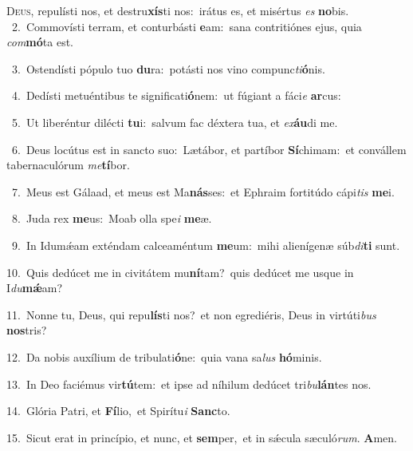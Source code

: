 \lettrine{\initial\textcolor{\initialcolor}{D}}{eus,} repulísti nos, et destru\-\textbf{xís}\-ti nos:~\star irátus es, et misértus \textit{es} \textbf{no}\-bis.\\
{\numbfont\textcolor{\numbcolor}{~2.}}~Commovísti terram, et conturbásti \textbf{e}\-am:~\star sana contritiónes ejus, quia \textit{com}\-\textbf{mó}ta est.\par
{\numbfont\textcolor{\numbcolor}{~3.}}~Ostendísti pópulo tuo \textbf{du}\-ra:~\star potásti nos vino compunc\-\textit{ti}\-\textbf{ó}nis.\par
{\numbfont\textcolor{\numbcolor}{~4.}}~Dedísti metuéntibus te significati\-\textbf{ó}\-nem:~\star ut fúgiant a fáci\textit{e} \textbf{ar}\-cus:\par
{\numbfont\textcolor{\numbcolor}{~5.}}~Ut liberéntur dilécti \textbf{tu}\-i:~\star salvum fac déxtera tua, et \textit{ex}\-\textbf{áu}di me.\par
{\numbfont\textcolor{\numbcolor}{~6.}}~Deus locútus est in sancto suo:~\dagger Lætábor, et partíbor \textbf{Sí}\-chimam:~\star et convállem tabernaculórum \textit{me}\-\textbf{tí}bor.\par
{\numbfont\textcolor{\numbcolor}{~7.}}~Meus est Gálaad, et meus est Ma\-\textbf{nás}\-ses:~\star et Ephraim fortitúdo cápi\textit{tis} \textbf{me}\-i.\par
{\numbfont\textcolor{\numbcolor}{~8.}}~Juda rex \textbf{me}\-us:~\star Moab olla spe\textit{i} \textbf{me}\-æ.\par
{\numbfont\textcolor{\numbcolor}{~9.}}~In Idumǽam exténdam calceaméntum \textbf{me}\-um:~\star mihi alienígenæ súb\-\textit{di}\-\textbf{ti} sunt.\par
{\numbfont\textcolor{\numbcolor}{10.}}~Quis dedúcet me in civitátem mu\-\textbf{ní}\-tam?~\star quis dedúcet me usque in I\-\textit{du}\-\textbf{mǽ}am?\par
{\numbfont\textcolor{\numbcolor}{11.}}~Nonne tu, Deus, qui repu\-\textbf{lís}\-ti nos?~\star et non egrediéris, Deus in virtúti\textit{bus} \textbf{nos}\-tris?\par
{\numbfont\textcolor{\numbcolor}{12.}}~Da nobis auxílium de tribulati\-\textbf{ó}\-ne:~\star quia vana sa\textit{lus} \textbf{hó}\-minis.\par
{\numbfont\textcolor{\numbcolor}{13.}}~In Deo faciémus vir\-\textbf{tú}\-tem:~\star et ipse ad níhilum dedúcet tri\-\textit{bu}\-\textbf{lán}tes nos.\par
{\numbfont\textcolor{\numbcolor}{14.}}~Glória Patri, et \textbf{Fí}\-lio,~\star et Spirítu\textit{i} \textbf{Sanc}\-to.\par
{\numbfont\textcolor{\numbcolor}{15.}}~Sicut erat in princípio, et nunc, et \textbf{sem}\-per,~\star et in sǽcula sæculó\-\textit{rum}\-. \textbf{A}\-men.\par
